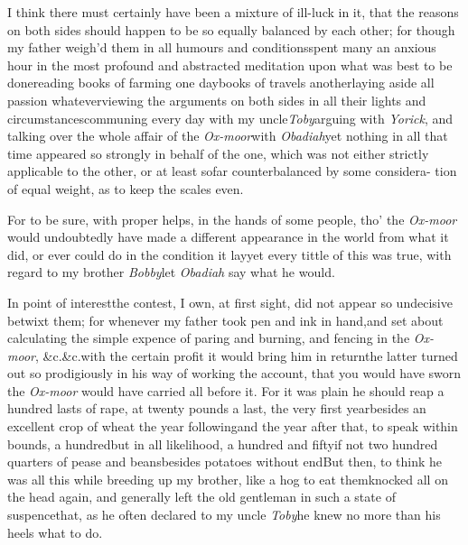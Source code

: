 \documentclass{article}
\begin{document}
I think there must certainly have been a mixture of ill-luck in
it, that the reasons on both sides should happen to be so equally
balanced by each other; for though my father weigh’d them in
all humours and conditions\tsk spent many an anxious hour
in the most profound and abstracted meditation upon what was best
to be done\tsh reading books of farming one
day\tsk books of travels another\tsk laying aside
all passion whatever\break\tsk viewing the arguments on both sides in
all their lights and circumstances\tsk\break communing every day with
my uncle\break \textit{Toby}\tsk arguing with \textit{Yorick}, and talking
over the whole affair of the \textit{Ox-moor}\break with
\textit{Obadiah}\tsk yet nothing in all that time appeared
so strongly in behalf of the one, which was not either
strictly\break
applicable to the other, or at least so\break far counterbalanced
by some considera-
tion of equal weight, as to keep the scales even.

For to be sure, with proper helps,\break
in the hands of some people, tho’\break
the \textit{Ox-moor} would undoubtedly have\break
made a different appearance in the world from what it did, or ever could
do in the condition it lay\tsk yet every tittle of this
was true, with regard to my brother \textit{Bobby}\tsh let
\textit{Obadiah} say what he\break
would.\tsh

In point of interest\tsh the contest, I own, at first
sight, did not appear so undecisive betwixt them; for whenever my
father took pen and ink in hand,\break and set about calculating the
simple expence of paring and burning, and fencing in the
\textit{Ox-moor}, \&c.\@ \&c.\tsk with the\break
certain profit it would bring him in return\tsk the latter turned out so
prodigiously in his way of working the account, that you would have
sworn the \textit{Ox-moor} would have carried all before it. For it
was plain he should reap a hundred lasts of rape, at twenty pounds a last, the very first
year\tsk besides an excellent crop of wheat the year
following\tsk and the year after that, to speak within
bounds, a hundred\tsh but in all likelihood, a hundred and
fifty\tsk if not two hundred quarters of pease and
beans\tsk besides potatoes without end\tsk But
then, to think he was all this while breeding up my brother, like a
hog to eat them\tsk knocked all on the head again, and
generally left the old gentleman in such a state of
suspence\tsk that, as he often declared to my uncle
\textit{Toby}\tsk he knew no more than his heels what to
do.
\end{document}
